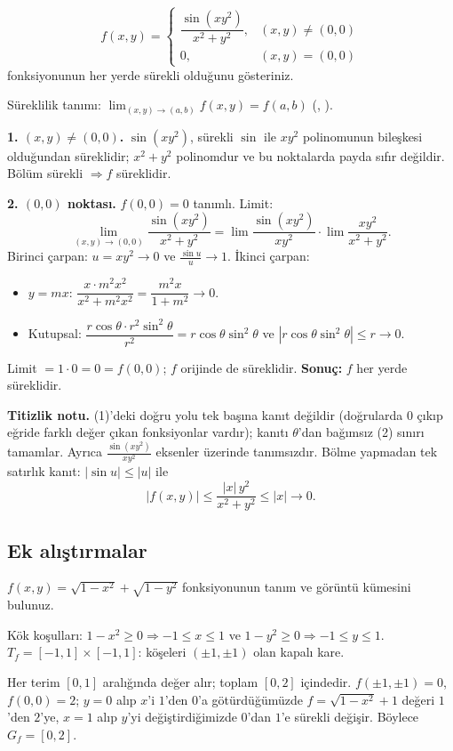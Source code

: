 \begin{soru}
\[
f(x,y)=\begin{cases}\dfrac{\sin(xy^2)}{x^2+y^2}, & (x,y)\neq(0,0)\\[6pt] 0, & (x,y)=(0,0)\end{cases}
\]
fonksiyonunun her yerde sürekli olduğunu gösteriniz.
\end{soru}
\begin{cevap}
Süreklilik tanımı: $\lim_{(x,y)\to(a,b)}f(x,y)=f(a,b)$ (, ).

\textbf{1. $(x,y)\neq(0,0)$.} $\sin(xy^2)$, sürekli $\sin$ ile $xy^2$ polinomunun bileşkesi olduğundan süreklidir;
$x^2+y^2$ polinomdur ve bu noktalarda payda sıfır değildir. Bölüm sürekli $\Rightarrow f$ süreklidir.

\textbf{2. $(0,0)$ noktası.} $f(0,0)=0$ tanımlı. Limit:
\[
\lim_{(x,y)\to(0,0)}\frac{\sin(xy^2)}{x^2+y^2}=\lim\frac{\sin(xy^2)}{xy^2}\cdot\lim\frac{xy^2}{x^2+y^2}.
\]
Birinci çarpan: $u=xy^2\to0$ ve $\frac{\sin u}{u}\to1$. İkinci çarpan:
\begin{itemize}
  \item[(1)] $y=mx$: $\dfrac{x\cdot m^2x^2}{x^2+m^2x^2}=\dfrac{m^2x}{1+m^2}\to0$.
  \item[(2)] Kutupsal: $\dfrac{r\cos\theta\cdot r^2\sin^2\theta}{r^2}=r\cos\theta\sin^2\theta$ ve
  $\boxed{|r\cos\theta\sin^2\theta|\le r}\to0$.
\end{itemize}
Limit $=1\cdot0=0=f(0,0)$; $f$ orijinde de süreklidir. \textbf{Sonuç:} $f$ her yerde süreklidir.

\textbf{Titizlik notu.} (1)'deki doğru yolu tek başına kanıt değildir (doğrularda $0$ çıkıp eğride farklı değer çıkan
fonksiyonlar vardır); kanıtı $\theta$'dan bağımsız (2) sınırı tamamlar. Ayrıca $\frac{\sin(xy^2)}{xy^2}$ eksenler
üzerinde tanımsızdır. Bölme yapmadan tek satırlık kanıt: $|\sin u|\le|u|$ ile
\[
|f(x,y)|\le\frac{|x|\,y^2}{x^2+y^2}\le|x|\to0 .
\]
\end{cevap}

\subsection{Ek alıştırmalar}

\begin{soru}
$f(x,y)=\sqrt{1-x^2}+\sqrt{1-y^2}$ fonksiyonunun tanım ve görüntü kümesini bulunuz.
\end{soru}
\begin{cevap}
Kök koşulları: $1-x^2\ge0\Rightarrow-1\le x\le1$ ve $1-y^2\ge0\Rightarrow-1\le y\le1$.
$T_f=[-1,1]\times[-1,1]$: köşeleri $(\pm1,\pm1)$ olan kapalı kare.

Her terim $[0,1]$ aralığında değer alır; toplam $[0,2]$ içindedir. $f(\pm1,\pm1)=0$, $f(0,0)=2$; $y=0$ alıp
$x$'i $1$'den $0$'a götürdüğümüzde $f=\sqrt{1-x^2}+1$ değeri $1$'den $2$'ye, $x=1$ alıp $y$'yi değiştirdiğimizde
$0$'dan $1$'e sürekli değişir. Böylece $G_f=[0,2]$.
\end{cevap}

